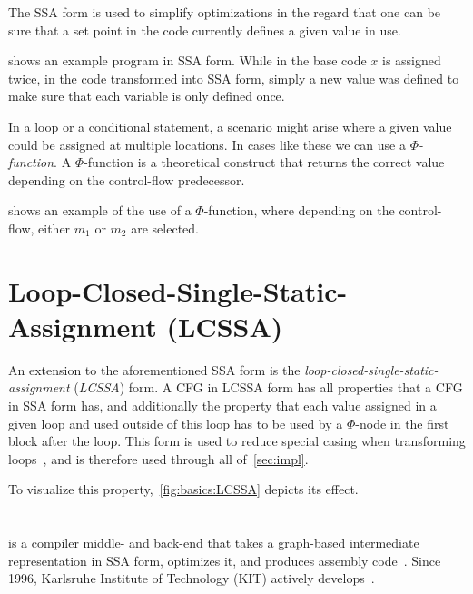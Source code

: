 The SSA form is used to simplify optimizations in the regard that one can be sure that a set point in the code currently defines a given value in use.

 shows an example program in SSA form.
While in the base code $x$ is assigned twice, in the code transformed into SSA form, simply a new value was defined to make sure that each variable is only defined once.



In a loop or a conditional statement, a scenario might arise where a given value could be assigned at multiple locations.
In cases like these we can use a \textit{$\Phi$-function}.
A $\Phi$-function is a theoretical construct that returns the correct value depending on the control-flow predecessor.

 shows an example of the use of a $\Phi$-function, where depending on the control-flow, either $m_1$ or $m_2$  are selected.



\section{Loop-Closed-Single-Static-Assignment (LCSSA)}\label{sec:basics:LCSSA}

An extension to the aforementioned SSA form is the \textit{loop-closed-single-static-assignment} (\textit{LCSSA}) form.
A CFG in LCSSA form has all properties that a CFG in SSA form has, and additionally the property that each value assigned in a given loop and used outside of this loop has to be used by a $\Phi$-node in the first block after the loop.
This form is used to reduce special casing when transforming loops~\cite{aebi18bachelorarbeit}, and is therefore used through all of~\cref{sec:impl}.

To visualize this property,~\cref{fig:basics:LCSSA} depicts its effect.



\section{\libFIRM}\label{sec:basics:firm}

\libFIRM{} is a compiler middle- and back-end that takes a graph-based intermediate representation in SSA form, optimizes it, and produces assembly code~\cite{libfirm}.
Since 1996, Karlsruhe Institute of Technology (KIT) actively develops~\libFIRM.


